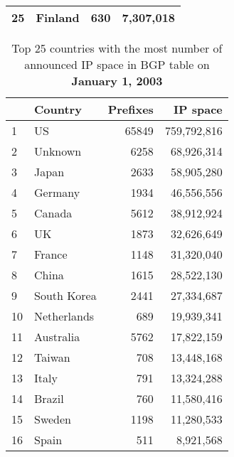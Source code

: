 \begin{table}[p]
\begin{center}
\begin{tabular}{|l||l|r|r|}
25      &       Finland 		&       630     &       7,307,018       \tabularnewline \hline
	\end{tabular}
	\end{center}
\end{table}

\begin{table}[p]
	\begin{center}
	\caption{Top 25 countries with the most number of announced IP space in BGP table on \textbf{January 1, 2003}}
	\label{tab:top25 bgp ip space 2003}
	\begin{tabular}{|l||l|r|r|}
		\hline
		&      \bf Country		&    Prefixes   &       IP space 		\tabularnewline \hline 
1       &       US      		&       65849   &       759,792,816     \tabularnewline \hline
2       &       Unknown		   	&       6258    &       68,926,314      \tabularnewline \hline
3       &       Japan   		&       2633    &       58,905,280      \tabularnewline \hline
4       &       Germany 		&       1934    &       46,556,556      \tabularnewline \hline
5       &       Canada  		&       5612    &       38,912,924      \tabularnewline \hline
6       &       UK      		&       1873    &       32,626,649      \tabularnewline \hline
7       &       France  		&       1148    &       31,320,040      \tabularnewline \hline
8       &       China   		&       1615    &       28,522,130      \tabularnewline \hline
9       &       South Korea     &       2441    &       27,334,687      \tabularnewline \hline
10      &       Netherlands     &       689     &       19,939,341      \tabularnewline \hline
11      &       Australia       &       5762    &       17,822,159      \tabularnewline \hline
12      &       Taiwan  		&       708     &       13,448,168      \tabularnewline \hline
13      &       Italy   		&       791     &       13,324,288      \tabularnewline \hline
14      &       Brazil  		&       760     &       11,580,416      \tabularnewline \hline
15      &       Sweden  		&       1198    &       11,280,533      \tabularnewline \hline
16      &       Spain   		&       511     &       8,921,568       \tabularnewline \hline

\end{tabular}
\end{center}
\end{table}
